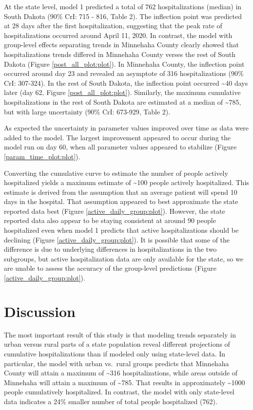 \documentclass[
]{article}
\begin{document}
At the state level, model 1 predicted a total of 762 hospitalizations (median) in South Dakota (90\% CrI: 715 - 816, Table 2). The inflection point was predicted at 28 days after the first hospitalization, suggesting that the peak rate of hospitalizations occurred around April 11, 2020. In contrast, the model with group-level effects separating trends in Minnehaha County clearly showed that hospitalizations trends differed in Minnehaha County verses the rest of South Dakota (Figure \ref{post_all_plot:plot}). In Minnehaha County, the inflection point occurred around day 23 and revealed an asymptote of 316 hospitalizations (90\% CrI: 307-324). In the rest of South Dakota, the inflection point occurred \textasciitilde40 days later (day 62, Figure \ref{post_all_plot:plot}). Similarly, the maximum cumulative hospitalizations in the rest of South Dakota are estimated at a median of \textasciitilde785, but with large uncertainty (90\% CrI: 673-929, Table 2).

As expected the uncertainty in parameter values improved over time as data were added to the model. The largest improvement appeared to occur during the model run on day 60, when all parameter values appeared to stabilize (Figure \ref{param_time_plot:plot}).

Converting the cumulative curve to estimate the number of people actively hospitalized yields a maximum estimate of \textasciitilde100 people actively hospitalized. This estimate is derived from the assumption that an average patient will spend 10 days in the hospital. That assumption appeared to best approximate the state reported data best (Figure \ref{active_daily_group:plot}). However, the state reported data also appear to be staying consistent at around 90 people hospitalized even when model 1 predicts that active hospitalizations should be declining (Figure \ref{active_daily_group:plot}). It is possible that some of the difference is due to underlying differences in hospitalizations in the two subgroups, but active hospitalization data are only available for the state, so we are unable to assess the accuracy of the group-level predictions (Figure \ref{active_daily_group:plot}).

\hypertarget{discussion}{%
\section{Discussion}\label{discussion}}

The most important result of this study is that modeling trends separately in urban versus rural parts of a state population reveal different projections of cumulative hospitalizations than if modeled only using state-level data. In particular, the model with urban vs.~rural groups predicts that Minnehaha County will attain a maximum of \textasciitilde316 hospitalizations, while areas outside of Minnehaha will attain a maximum of \textasciitilde785. That results in approximately \textasciitilde1000 people cumulatively hospitalized. In contrast, the model with only state-level data indicates a 24\% smaller number of total people hospitalized (762).
\end{document}
